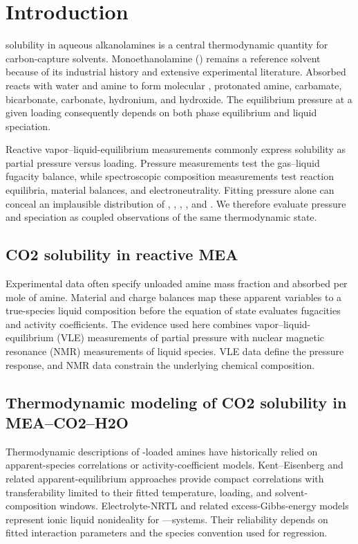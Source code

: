 \section{Introduction}\label{sec:introduction}
\COtwo solubility in aqueous alkanolamines is a central thermodynamic quantity for carbon-capture solvents.  Monoethanolamine (\MEA) remains a reference solvent because of its industrial history and extensive experimental literature.  Absorbed \COtwo reacts with water and amine to form molecular \COtwo, protonated amine, carbamate, bicarbonate, carbonate, hydronium, and hydroxide.  The equilibrium \COtwo pressure at a given loading consequently depends on both phase equilibrium and liquid speciation.

Reactive vapor--liquid-equilibrium measurements commonly express \COtwo solubility as partial pressure versus loading.  Pressure measurements test the gas--liquid fugacity balance, while spectroscopic composition measurements test reaction equilibria, material balances, and electroneutrality.  Fitting pressure alone can conceal an implausible distribution of \MEA, \MEAH, \MEACOO, \HCOthree, and \COthree.  We therefore evaluate pressure and speciation as coupled observations of the same thermodynamic state.

\subsection{CO2 solubility in reactive MEA}
Experimental data often specify unloaded amine mass fraction and absorbed \COtwo per mole of amine.  Material and charge balances map these apparent variables to a true-species liquid composition before the equation of state evaluates fugacities and activity coefficients.  The evidence used here combines vapor--liquid-equilibrium (VLE) measurements of \COtwo partial pressure with nuclear magnetic resonance (NMR) measurements of liquid species.  VLE data define the pressure response, and NMR data constrain the underlying chemical composition.

\subsection{Thermodynamic modeling of CO2 solubility in MEA--CO2--H2O}
Thermodynamic descriptions of \COtwo-loaded amines have historically relied on apparent-species correlations or activity-coefficient models.  Kent--Eisenberg and related apparent-equilibrium approaches provide compact correlations with transferability limited to their fitted temperature, loading, and solvent-composition windows.  Electrolyte-NRTL and related excess-Gibbs-energy models represent ionic liquid nonideality for \MEA--\COtwo--\HtwoO systems\cite{Zhang2011,Morgan2017b,Mouhoubi2020,Hilliard2008}.  Their reliability depends on fitted interaction parameters and the species convention used for regression.

